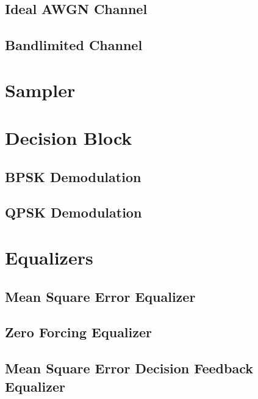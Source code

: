 \documentclass[]{article}
\begin{document}
\subsection{Ideal AWGN Channel}
\label{app:awgn_channel}


\subsection{Bandlimited Channel}
\label{app:bandlimited}


\section{Sampler}
\label{app:sampler}


\section{Decision Block}
\label{app:dblocks}
\subsection{BPSK Demodulation}
\label{app:bpsk_demod}


\subsection{QPSK Demodulation}
\label{app:qpsk_demod}


\section{Equalizers}
\label{app:equal}
\subsection{Mean Square Error Equalizer}
\label{app:mse}


%

\subsection{Zero Forcing Equalizer}
\label{app:zf}


\subsection{Mean Square Error Decision Feedback Equalizer}
\label{app:dfe}
%
\end{document}
